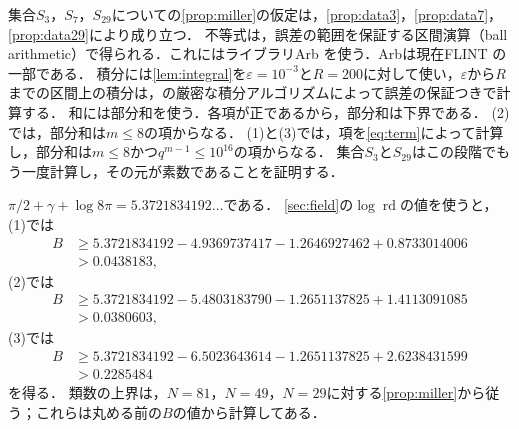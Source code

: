 \documentclass[11pt,a4paper]{ltjsarticle}
\makeatletter
\theoremstyle{ja}
\renewenvironment{proof}[1][証明]{\par
  \pushQED{\qed}\normalfont \topsep6\p@\@plus6\p@\relax
  \trivlist
  \item[\hskip\labelsep\bfseries #1]\hspace{1\zw}\ignorespaces
}{\popQED\endtrivlist\@endpefalse}
\makeatother
\begin{document}
\begin{proof}
集合$S_3$，$S_7$，$S_{29}$についての\cref{prop:miller}の仮定は，\cref{prop:data3}，\cref{prop:data7}，\cref{prop:data29}により成り立つ．
不等式は，誤差の範囲を保証する区間演算（ball arithmetic）で得られる．これにはライブラリArb \cite{Jo17}を使う．Arbは現在FLINT \cite{FLINT}の一部である．
積分には\cref{lem:integral}を$\varepsilon = 10^{-3}$と$R = 200$に対して使い，$\varepsilon$から$R$までの区間上の積分は，\cite{Jo18}の厳密な積分アルゴリズムによって誤差の保証つきで計算する．
和には部分和を使う．各項が正であるから，部分和は下界である．
(2)では，部分和は$m \le 8$の項からなる．
(1)と(3)では，項を\eqref{eq:term}によって計算し，部分和は$m \le 8$かつ$q^{m-1} \le 10^{16}$の項からなる．
集合$S_3$と$S_{29}$はこの段階でもう一度計算し，その元が素数であることを証明する．

$\pi/2 + \gamma + \log 8\pi = 5.3721834192\ldots$である．
\cref{sec:field}の$\log \operatorname{rd}$の値を使うと，(1)では
\begin{align*}
B &\ge 5.3721834192 - 4.9369737417 - 1.2646927462 + 0.8733014006 \\
&> 0.0438183,
\end{align*}
(2)では
\begin{align*}
B &\ge 5.3721834192 - 5.4803183790 - 1.2651137825 + 1.4113091085 \\
&> 0.0380603,
\end{align*}
(3)では
\begin{align*}
B &\ge 5.3721834192 - 6.5023643614 - 1.2651137825 + 2.6238431599 \\
&> 0.2285484
\end{align*}
を得る．
類数の上界は，$N = 81$，$N = 49$，$N = 29$に対する\cref{prop:miller}から従う；これらは丸める前の$B$の値から計算してある．
\end{proof}
\end{document}

